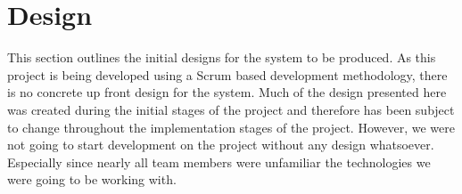 \chapter{Design}

This section outlines the initial designs for the system to be produced. As this project is being developed using a Scrum based development methodology, there is no concrete up front design for the system. Much of the design presented here was created during the initial stages of the project and therefore has been subject to change throughout the implementation stages of the project. However, we were not going to start development on the project without any design whatsoever. Especially since nearly all team members were unfamiliar the technologies we were going to be working with.

